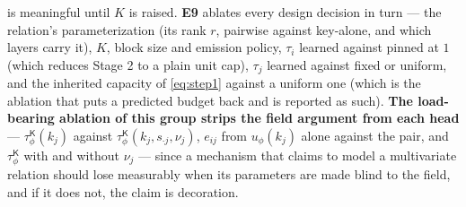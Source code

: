 \documentclass{article}
\newcommand{\tauK}{\tau^{\mathsf{K}}_\phi}
\begin{document}
is meaningful until $K$ is raised. \textbf{E9} ablates every design decision in turn --- the relation's parameterization (its rank
$r$, pairwise against key-alone, and which layers carry it), $K$,
block size and emission policy, $\tau_i$ learned against pinned at $1$ (which reduces Stage 2 to
a plain unit cap), $\tau_j$ learned against fixed or uniform, and the inherited capacity of
\eqref{eq:step1} against a uniform one (which is the ablation that puts a predicted budget back
and is reported as such). \textbf{The load-bearing ablation of this group strips the field
argument from each head} --- $\tauK(k_j)$ against $\tauK(k_j,s_{\cdot j},\nu_j)$,
$e_{ij}$ from $u_\phi(k_j)$ alone against the pair, and $\tauK$ with and without $\nu_j$
--- since a mechanism that claims to model a multivariate relation should lose measurably when
its parameters are made blind to the field, and if it does not, the claim is decoration.
\end{document}
